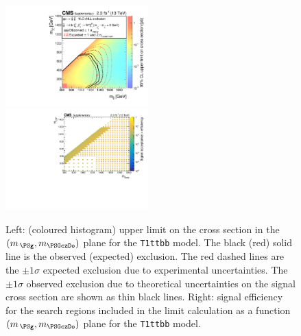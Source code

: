\clearpage
\begin{figure}[!h]
  \begin{center}
    \includegraphics[width=0.49\textwidth]{RA1T1ttbbXSEC_aux} \, 
    \includegraphics[width=0.49\textwidth]{T1ttbb_merging_4_cats_aux} \,     
  \end{center}
  \caption{Left: (coloured histogram) upper limit on the cross section in the $(m_{\,\PSg}, m_{\PSGczDo})$ plane for the \texttt{T1ttbb} model. 
  The black (red) solid line is the observed (expected) exclusion. The red dashed lines are the $\pm1\sigma$ expected exclusion due to experimental uncertainties. 
  The $\pm1\sigma$ observed exclusion due to theoretical uncertainties on the signal cross section are shown as thin black lines. 
  Right: signal efficiency for the search regions included in the limit calculation as a function $(m_{\,\PSg}, m_{\PSGczDo})$ plane for the \texttt{T1ttbb} model. 
  \label{fig:T1ttbb_excl}}
\end{figure}

